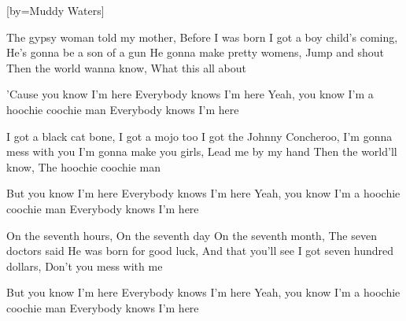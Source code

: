 

[by=Muddy Waters]


\beginverse
The gypsy woman told my mother, Before I was born
I got a boy child's coming, He's gonna be a son of a gun
He gonna make pretty womens, Jump and shout
Then the world wanna know, What this all about

'Cause you know I'm here
Everybody knows I'm here
Yeah, you know I'm a hoochie coochie man
Everybody knows I'm here
\endverse

\beginverse
I got a black cat bone, I got a mojo too
I got the Johnny Concheroo, I'm gonna mess with you
I'm gonna make you girls, Lead me by my hand
Then the world'll know, The hoochie coochie man

But you know I'm here
Everybody knows I'm here
Yeah, you know I'm a hoochie coochie man
Everybody knows I'm here
\endverse

\beginverse
On the seventh hours, On the seventh day
On the seventh month, The seven doctors said
He was born for good luck, And that you'll see
I got seven hundred dollars, Don't you mess with me

But you know I'm here
Everybody knows I'm here
Yeah, you know I'm a hoochie coochie man
Everybody knows I'm here
\endverse



\chordson
\endsong

